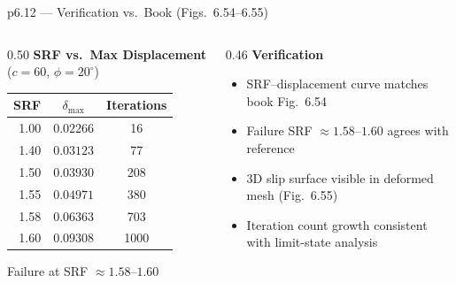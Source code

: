 \documentclass[aspectratio=169]{beamer}
\begin{document}
\begin{frame}{p6.12 --- Verification vs.\ Book (Figs.~6.54--6.55)}
    \begin{columns}[t]
        \begin{column}{0.50\textwidth}
            \textbf{SRF vs.\ Max Displacement} ($c{=}60$, $\phi{=}20^\circ$)
            \begin{center}
            \small
            \begin{tabular}{rcc}
                \toprule
                SRF & $\delta_\text{max}$ & Iterations \\
                \midrule
                1.00 & $0.02266$ & 16 \\
                1.40 & $0.03123$ & 77 \\
                1.50 & $0.03930$ & 208 \\
                1.55 & $0.04971$ & 380 \\
                1.58 & $0.06363$ & 703 \\
                1.60 & $0.09308$ & 1000 \\
                \bottomrule
            \end{tabular}
            \end{center}
            \vspace{0.15cm}
            Failure at SRF $\approx 1.58$--$1.60$
        \end{column}
        \begin{column}{0.46\textwidth}
            \textbf{Verification}
            \begin{itemize}
                \setlength\itemsep{0.5em}
                \item[\textcolor{tugreen}{\ding{51}}] SRF--displacement curve matches book Fig.~6.54
                \item[\textcolor{tugreen}{\ding{51}}] Failure SRF $\approx 1.58$--$1.60$ agrees with reference
                \item[\textcolor{tugreen}{\ding{51}}] 3D slip surface visible in deformed mesh (Fig.~6.55)
                \item[\textcolor{tugreen}{\ding{51}}] Iteration count growth consistent with limit-state analysis
            \end{itemize}
        \end{column}
    \end{columns}
\end{frame}
\end{document}
